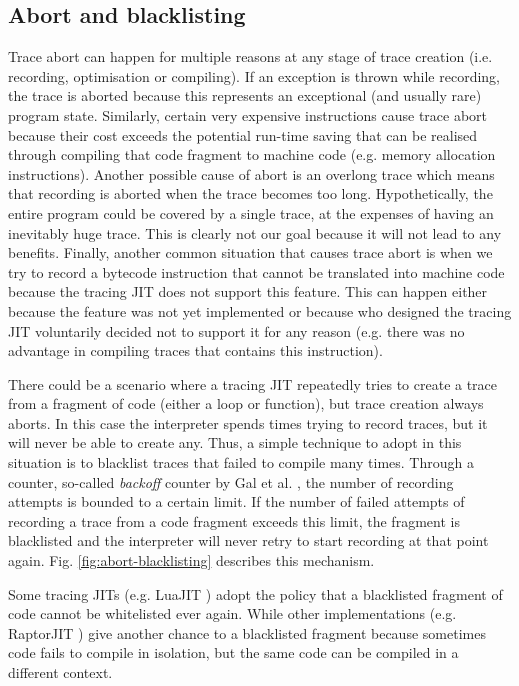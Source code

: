 \subsection{Abort and blacklisting}
\label{subsec:abort-blacklisting}
Trace abort can happen for multiple reasons at any stage of trace creation (i.e. recording, optimisation or compiling). If an exception is thrown while recording, the trace is aborted because this represents an exceptional (and usually rare) program state. Similarly, certain very expensive instructions cause trace abort because their cost exceeds the potential run-time saving that can be realised through compiling that code fragment to machine code (e.g. memory allocation instructions). Another possible cause of abort is an overlong trace which means that recording is aborted when the trace becomes too long. Hypothetically, the entire program could be covered by a single trace, at the expenses of having an inevitably huge trace. This is clearly not our goal because it will not lead to any benefits. Finally, another common situation that causes trace abort is when we try to record a bytecode instruction that cannot be translated into machine code because the tracing JIT does not support this feature. This can happen either because the feature was not yet implemented or because who designed the tracing JIT voluntarily decided not to support it for any reason (e.g. there was no advantage in compiling traces that contains this instruction).

There could be a scenario where a tracing JIT repeatedly tries to create a trace from a fragment of code (either a loop or function), but trace creation always aborts. In this case the interpreter spends times trying to record traces, but it will never be able to create any. Thus, a simple technique to adopt in this situation is to blacklist traces that failed to compile many times. Through a counter, so-called \textit{backoff} counter by Gal et al. \cite{gal2009trace}, the number of recording attempts is bounded to a certain limit. If the number of failed attempts of recording a trace from a code fragment exceeds this limit, the fragment is blacklisted and the interpreter will never retry to start recording at that point again. Fig. \ref{fig:abort-blacklisting} describes this mechanism.

Some tracing JITs (e.g. LuaJIT \cite{pall2012luajit}) adopt the policy that a blacklisted fragment of code cannot be whitelisted ever again. While other implementations (e.g. RaptorJIT \cite{gorrie2017raptorjit}) give another chance to a blacklisted fragment because sometimes code fails to compile in isolation, but the same code can be compiled in a different context.

